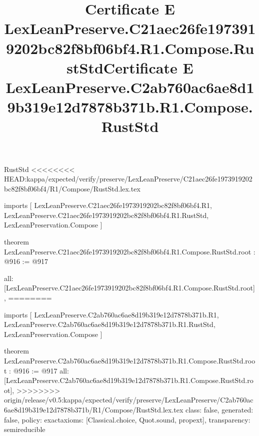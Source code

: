 \begin{lexlean}{RustStd}
<<<<<<<< HEAD:kappa/expected/verify/preserve/LexLeanPreserve/C21aec26fe1973919202bc82f8bf06bf4/R1/Compose/RustStd.lex.tex
\title{Certificate E LexLeanPreserve.C21aec26fe1973919202bc82f8bf06bf4.R1.Compose.RustStd}
\begin{coremodule}
imports [
  LexLeanPreserve.C21aec26fe1973919202bc82f8bf06bf4.R1,
  LexLeanPreserve.C21aec26fe1973919202bc82f8bf06bf4.R1.RustStd,
  LexLeanPreservation.Compose
]

theorem LexLeanPreserve.C21aec26fe1973919202bc82f8bf06bf4.R1.Compose.RustStd.root : @916 := @917 {
  all: [LexLeanPreserve.C21aec26fe1973919202bc82f8bf06bf4.R1.Compose.RustStd.root],
========
\title{Certificate E LexLeanPreserve.C2ab760ac6ae8d19b319e12d7878b371b.R1.Compose.RustStd}
\begin{coremodule}
imports [
  LexLeanPreserve.C2ab760ac6ae8d19b319e12d7878b371b.R1,
  LexLeanPreserve.C2ab760ac6ae8d19b319e12d7878b371b.R1.RustStd,
  LexLeanPreservation.Compose
]

theorem LexLeanPreserve.C2ab760ac6ae8d19b319e12d7878b371b.R1.Compose.RustStd.root : @916 := @917 {
  all: [LexLeanPreserve.C2ab760ac6ae8d19b319e12d7878b371b.R1.Compose.RustStd.root],
>>>>>>>> origin/release/v0.5:kappa/expected/verify/preserve/LexLeanPreserve/C2ab760ac6ae8d19b319e12d7878b371b/R1/Compose/RustStd.lex.tex
  class: false,
  generated: false,
  policy: exact{axioms: [Classical.choice, Quot.sound, propext]},
  transparency: semireducible
}


\end{coremodule}}
\end{coremodule}
\end{lexlean}
